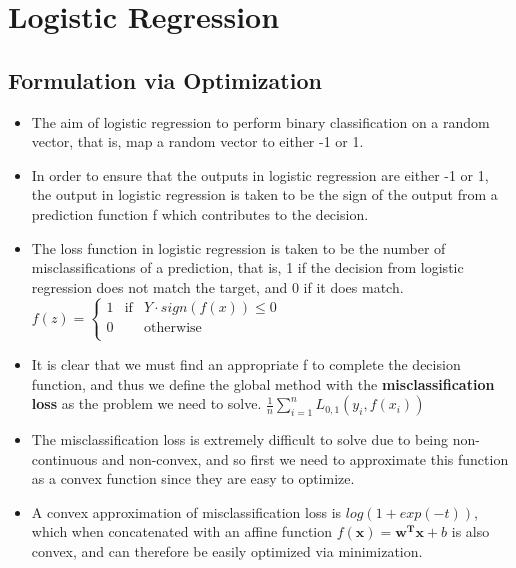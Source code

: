 \documentclass[english]{latex4ei/latex4ei_sheet}
\begin{document}

\newpage

\section{Logistic Regression}
\begin{sectionbox}
\subsection{Formulation via Optimization}
\begin{itemize}
\item The aim of logistic regression to perform binary classification on a random vector, that is, map a random vector to either -1 or 1.
\item In order to ensure that the outputs in logistic regression are either -1 or 1, the output in logistic regression is taken to be the sign of the output from a prediction function f which contributes to the decision.
\item The loss function in logistic regression is taken to be the number of misclassifications of a prediction, that is, 1 if the decision from logistic regression does not match the target, and 0 if it does match.
$f(z) = \left\{ \begin{array}{rcl}
     1 & \mbox{if}
& Y\cdot sign(f(x))\leq 0 \\ 0 & & \mbox{otherwise}\\
\end{array}\right.$
\item It is clear that we must find an appropriate f  to complete the decision function, and thus we define the global method with the \textbf{misclassification loss} as the problem we need to solve.
$ \frac{1}{n}\sum\limits_{i=1}^nL_{0,1}(y_i,f(x_i))$
\item The misclassification loss is extremely difficult to solve due to being non-continuous and non-convex, and so first we need to approximate this function as a convex function since they are easy to optimize.
\item A convex approximation of misclassification loss is $log(1 + exp(-t))$, which when concatenated with  an affine function $f(\boldsymbol{x})=\boldsymbol{w^Tx}+b$ is also convex, and can therefore be easily optimized via minimization.\\
\begin{center}

\end{center}
\end{itemize}
\end{sectionbox}
\end{document}
